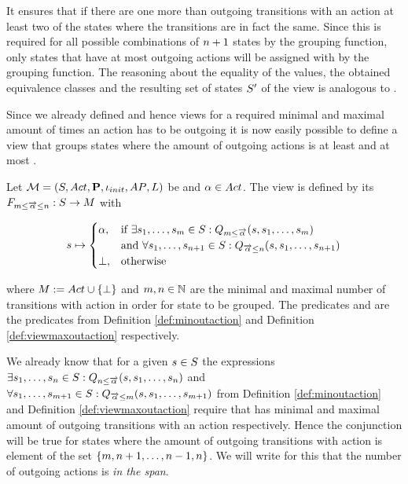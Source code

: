 \documentclass[preview]{standalone}
\begin{document}
 It ensures that if there are one more than \numoutact outgoing transitions with an action \action at least two of the states where the transitions  are in fact the same. Since this is required for all possible combinations of $\numoutact + 1$ states by the grouping function, only states that have at most \numoutact outgoing actions will be assigned with \action by the grouping function. The reasoning about the equality of the \grpfctN values, the obtained equivalence classes and the resulting set of states $\states'$ of the view is analogous to \viewminoutaction.

Since we already defined \grpfctsN and hence views for a required minimal and maximal amount of times an action has to be outgoing it is now easily possible to define a view that groups states where the amount of outgoing actions is at least \numoutact and at most \numoutactb. 

\begin{definition}
	Let $\chgph = \chgphtuple$ be \chosengraphtypeN and $\action \in \actions$. The view 
	\viewspanoutaction is defined by its \grpfctN $\gfctspanoutaction : \states \to \arbset$ with
	
	\[
	\state \mapsto
	\begin{cases}
		\action,				& \text{if } \exists \state_1, \dots, \state_\numoutactb \in \states: \predminoutact[\numoutactb] \\ &\text{and } \forall \state_1, \dots, \state_{\numoutact+1} \in \states: \predmaxoutact \\
		\remelem,          	& \text{otherwise}
	\end{cases}
	\]
	
	where $\imggrp := \actions \cup \remset$ and $\numoutactb, \numoutact \in \natnums$ are the minimal and maximal number of transitions with action \action in order for state to be grouped. The predicates \predminoutact and \predmaxoutact are the predicates from Definition \ref{def:minoutaction} and Definition \ref{def:viewmaxoutaction} respectively.
\end{definition}

We already know that for a given $\state \in \states$ the expressions $\exists \state_1, \dots, \state_\numoutact \in \states: \predminoutact$ and $\forall \state_1, \dots, \state_{\numoutactb+1} \in \states: \predmaxoutact[\numoutactb]$ from Definition \ref{def:minoutaction} and Definition \ref{def:viewmaxoutaction} require that \state has minimal and maximal amount of outgoing transitions with an action \action respectively. Hence the conjunction will be true for states where the amount of outgoing transitions with action \action is element of the set $\{\numoutactb, \numoutact+1, \dots, \numoutact-1, \numoutact\}$. We will write for this that the number of outgoing actions is \emph{in the span}.
\end{document}
